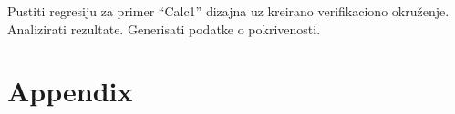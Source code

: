 Pustiti regresiju za primer ``Calc1'' dizajna uz kreirano verifikaciono
okruženje. Analizirati rezultate. Generisati podatke o pokrivenosti.


\section{Appendix}









